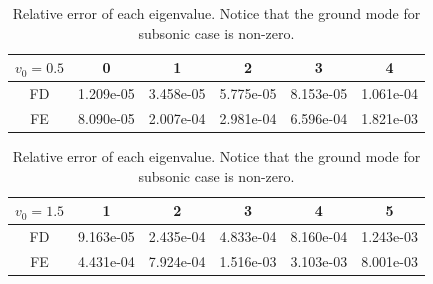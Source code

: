 \begin{table} [H]
	\centering
	\caption{Relative error of each eigenvalue. Notice that the ground mode for subsonic case is non-zero.}
	\begin{tabular}{|c|c|c|c|c|c|}
		\hline
		$v_0=0.5$   & 0 & 1 & 2 & 3 & 4 \\
		\hline
		FD & 1.209e-05 & 3.458e-05 & 5.775e-05 & 8.153e-05 & 1.061e-04 \\
		\hline
		FE & 8.090e-05 & 2.007e-04 & 2.981e-04 & 6.596e-04 & 1.821e-03  \\
		\hline
	\end{tabular}
	\begin{tabular}{|c|c|c|c|c|c|}
		\hline
		$v_0=1.5$   & 1 & 2 & 3 & 4 & 5 \\
		\hline
		FD & 9.163e-05 & 2.435e-04 & 4.833e-04 & 8.160e-04 & 1.243e-03 \\
		\hline
		FE & 4.431e-04 & 7.924e-04 & 1.516e-03 & 3.103e-03 & 8.001e-03  \\
		\hline
	\end{tabular}
	\label{table:eigenvalue-error-fixed-open}
\end{table}

